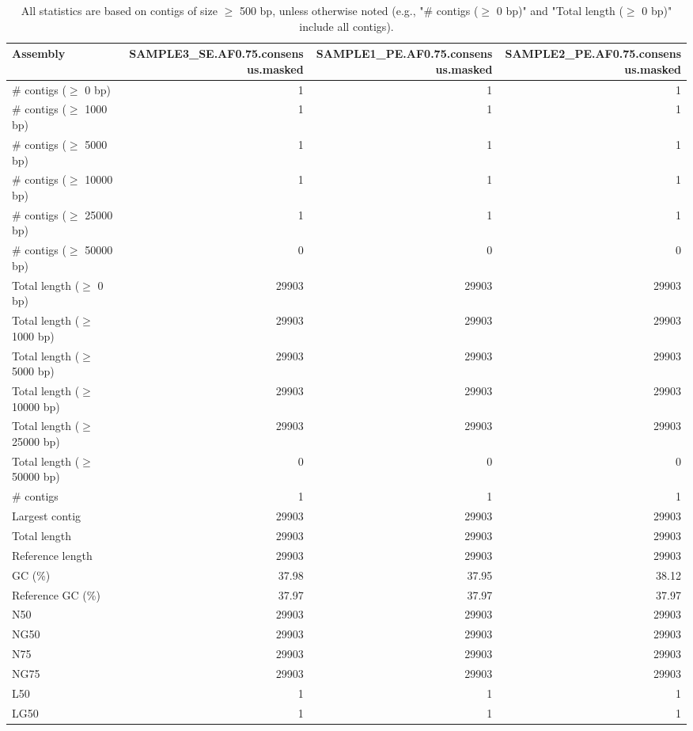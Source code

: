 \documentclass[12pt,a4paper]{article}
\begin{document}
\begin{table}[ht]
\begin{center}
\caption{All statistics are based on contigs of size $\geq$ 500 bp, unless otherwise noted (e.g., "\# contigs ($\geq$ 0 bp)" and "Total length ($\geq$ 0 bp)" include all contigs).}
\begin{tabular}{|l*{3}{|r}|}
\hline
Assembly & SAMPLE3\_SE.AF0.75.consensus.masked & SAMPLE1\_PE.AF0.75.consensus.masked & SAMPLE2\_PE.AF0.75.consensus.masked \\ \hline
\# contigs ($\geq$ 0 bp) & 1 & 1 & 1 \\ \hline
\# contigs ($\geq$ 1000 bp) & 1 & 1 & 1 \\ \hline
\# contigs ($\geq$ 5000 bp) & 1 & 1 & 1 \\ \hline
\# contigs ($\geq$ 10000 bp) & 1 & 1 & 1 \\ \hline
\# contigs ($\geq$ 25000 bp) & 1 & 1 & 1 \\ \hline
\# contigs ($\geq$ 50000 bp) & 0 & 0 & 0 \\ \hline
Total length ($\geq$ 0 bp) & 29903 & 29903 & 29903 \\ \hline
Total length ($\geq$ 1000 bp) & 29903 & 29903 & 29903 \\ \hline
Total length ($\geq$ 5000 bp) & 29903 & 29903 & 29903 \\ \hline
Total length ($\geq$ 10000 bp) & 29903 & 29903 & 29903 \\ \hline
Total length ($\geq$ 25000 bp) & 29903 & 29903 & 29903 \\ \hline
Total length ($\geq$ 50000 bp) & 0 & 0 & 0 \\ \hline
\# contigs & 1 & 1 & 1 \\ \hline
Largest contig & 29903 & 29903 & 29903 \\ \hline
Total length & 29903 & 29903 & 29903 \\ \hline
Reference length & 29903 & 29903 & 29903 \\ \hline
GC (\%) & 37.98 & 37.95 & 38.12 \\ \hline
Reference GC (\%) & 37.97 & 37.97 & 37.97 \\ \hline
N50 & 29903 & 29903 & 29903 \\ \hline
NG50 & 29903 & 29903 & 29903 \\ \hline
N75 & 29903 & 29903 & 29903 \\ \hline
NG75 & 29903 & 29903 & 29903 \\ \hline
L50 & 1 & 1 & 1 \\ \hline
LG50 & 1 & 1 & 1 \\ \hline

\end{tabular}
\end{center}
\end{table}
\end{document}
